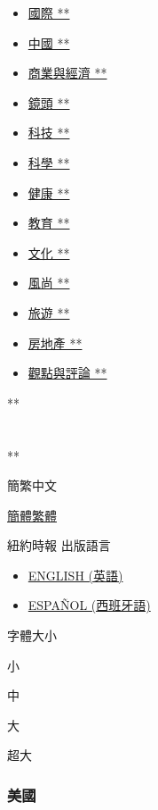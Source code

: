 \begin{itemize}
\tightlist
\item
  \href{/world/}{國際 **}
\item
  \href{/china/}{中國 **}
\item
  \href{/business/}{商業與經濟 **}
\item
  \href{/lens/}{鏡頭 **}
\item
  \href{/technology/}{科技 **}
\item
  \href{/science/}{科學 **}
\item
  \href{/health/}{健康 **}
\item
  \href{/education/}{教育 **}
\item
  \href{/culture/}{文化 **}
\item
  \href{/style/}{風尚 **}
\item
  \href{/travel/}{旅遊 **}
\item
  \href{/real-estate/}{房地產 **}
\item
  \href{/opinion/}{觀點與評論 **}
\end{itemize}

**

\section{\texorpdfstring{\href{/}{}}{}}

**

簡繁中文

\href{/usa/20200709/harvard-mit-trump-ice-students/?changeLang=zh-hans}{簡體}\href{/usa/20200709/harvard-mit-trump-ice-students/?changeLang=zh-hant}{繁體}

紐約時報 出版語言

\begin{itemize}
\tightlist
\item
  \href{https://www.nytimes.com/}{ENGLISH (英語)}
\item
  \href{https://www.nytimes.com/es/}{ESPAÑOL (西班牙語)}
\end{itemize}

字體大小

小

中

大

超大

\hypertarget{ux7f8eux570b}{%
\subsubsection{美國}\label{ux7f8eux570b}}

